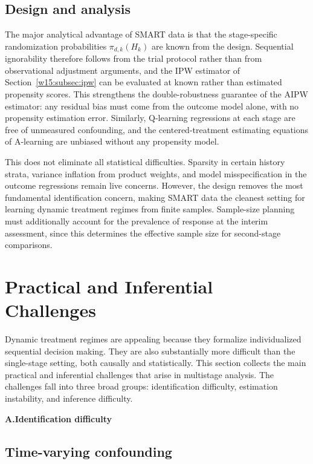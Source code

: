 \documentclass[master.tex]{subfiles}
\begin{document}
\subsection{Design and analysis}

The major analytical advantage of SMART data is that the stage-specific randomization probabilities $\pi_{d,k}(H_k)$ are known from the design. Sequential ignorability therefore follows from the trial protocol rather than from observational adjustment arguments, and the IPW estimator of Section~\ref{w15:subsec:ipw} can be evaluated at known rather than estimated propensity scores. This strengthens the double-robustness guarantee of the AIPW estimator: any residual bias must come from the outcome model alone, with no propensity estimation error. Similarly, Q-learning regressions at each stage are free of unmeasured confounding, and the centered-treatment estimating equations of A-learning are unbiased without any propensity model.

This does not eliminate all statistical difficulties. Sparsity in certain history strata, variance inflation from product weights, and model misspecification in the outcome regressions remain live concerns. However, the design removes the most fundamental identification concern, making SMART data the cleanest setting for learning dynamic treatment regimes from finite samples. Sample-size planning must additionally account for the prevalence of response at the interim assessment, since this determines the effective sample size for second-stage comparisons.

\section{Practical and Inferential Challenges}
\label{w15:sec:challenges}

Dynamic treatment regimes are appealing because they formalize individualized sequential decision making. They are also substantially more difficult than the single-stage setting, both causally and statistically. This section collects the main practical and inferential challenges that arise in multistage analysis. The challenges fall into three broad groups: identification difficulty, estimation instability, and inference difficulty.

\medskip
\noindent\textbf{A.\enspace Identification difficulty}
\medskip

\subsection{Time-varying confounding}
\end{document}
